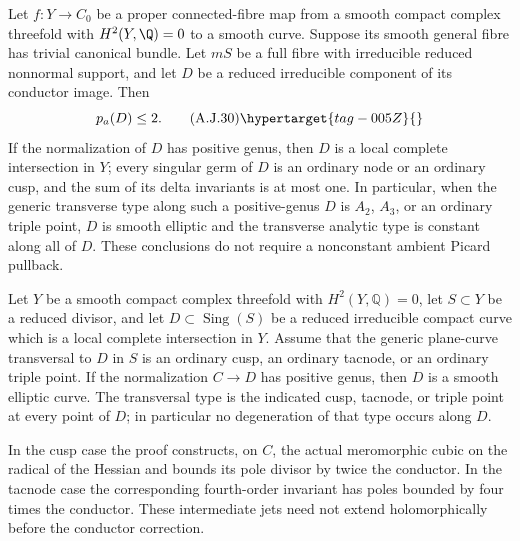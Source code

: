 
\begin{proposition}\hypertarget{tag-01B4}{}\label{cdp:st:A.5.14}


Let $f:Y\to C_0$ be a proper connected-fibre map from a
smooth compact complex threefold with $H^2(Y,\Q)=0$ to
a smooth curve. Suppose its smooth general fibre has
trivial canonical bundle. Let $mS$ be a full fibre with
irreducible reduced nonnormal support, and let $D$ be
a reduced irreducible component of its conductor image.
Then
\[
                         p_a(D)\le2.                \tag{A.J.30}\hypertarget{tag-005Z}{}\label{cdp:eq:A.J.30}
\]
If the normalization of $D$ has positive genus, then
$D$ is a local complete intersection in $Y$; every
singular germ of $D$ is an ordinary node or an ordinary
cusp, and the sum of its delta invariants is at most
one. In particular, when the generic transverse type
along such a positive-genus $D$ is $A_2$, $A_3$, or an
ordinary triple point, $D$ is smooth elliptic and the
transverse analytic type is constant along all of $D$.
These conclusions do not require a nonconstant ambient
Picard pullback.
\end{proposition}

\begin{proposition}\hypertarget{tag-01BF}{}\label{cdp:st:A.5.5}


Let $Y$ be a smooth compact complex threefold with
$H^2(Y,\mathbb Q)=0$, let $S\subset Y$ be a reduced divisor,
and let $D\subset\operatorname{Sing}(S)$ be a reduced
irreducible compact curve which is a local complete intersection
in $Y$. Assume that the generic plane-curve transversal to $D$
in $S$ is an ordinary cusp, an ordinary tacnode, or an ordinary
triple point.
If the normalization $C\to D$ has positive genus, then $D$ is
a smooth elliptic curve. The transversal type is the indicated
cusp, tacnode, or triple point at every point of $D$;
in particular no degeneration of that type occurs along $D$.

In the cusp case the proof constructs, on $C$, the actual
meromorphic cubic on the radical of the Hessian and bounds its
pole divisor by twice the conductor. In the tacnode case the
corresponding fourth-order invariant has poles bounded by four
times the conductor. These intermediate jets need not extend
holomorphically before the conductor correction.
\end{proposition}


